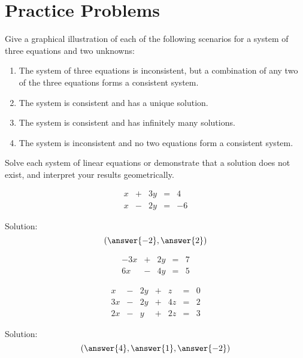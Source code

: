 \documentclass{ximera}
\begin{document}




\section*{Practice Problems}
\begin{problem}\label{prob:sysgraphillustration}
Give a graphical illustration of each of the following scenarios for a system of three equations and two unknowns:
  \begin{enumerate}
  \item The system of three equations is inconsistent, but a combination of any two of the three equations forms a consistent system.
  \item The system is consistent and has a unique solution.
  \item The system is consistent and has infinitely many solutions.
  \item The system is inconsistent and no two equations form a consistent system.
  \end{enumerate}
\end{problem}

\begin{problem} 
Solve each system of linear equations or demonstrate that a solution does not exist, and interpret your results geometrically.
  \begin{problem}\label{prob:solvesys1}
  $$\begin{array}{ccccc}
      x & +&3y&= &4 \\
	 x& -&2y&=&-6
    \end{array}$$
    
    Solution: $$(\answer{-2},\answer{2})$$
  \end{problem}
  
  \begin{problem}\label{prob:solvesys2}
  $$\begin{array}{ccccc}
      -3x & +&2y&= &7 \\
	 6x& -&4y&=&5
    \end{array}$$
  \end{problem}
  
  
  \begin{problem}\label{prob:solvesys3}
$$\begin{array}{ccccccc}
      x & -&2y&+&z&= &0 \\
	 3x& -&2y&+&4z&=&2\\
     2x& -&y&+&2z&=&3
    \end{array}$$
    
Solution:    $$(\answer{4},\answer{1},\answer{-2})$$
\end{problem}
\end{problem}
\end{document}
